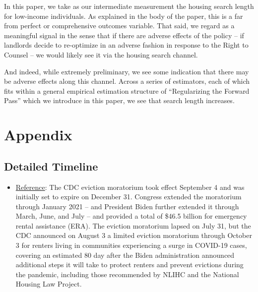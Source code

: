 \documentclass[a4paper,12pt]{article}
\begin{document}
In this paper, we take as our intermediate measurement the housing search length for low-income individuals. As explained in the body of the paper, this is a far from perfect or comprehensive outcomes variable. That said, we regard as a meaningful signal in the sense that if there are adverse effects of the policy -- if landlords decide to re-optimize in an adverse fashion in response to the Right to Counsel -- we would likely see it via the housing search channel. \par 
And indeed, while extremely preliminary, we see some indication that there may be adverse effects along this channel. Across a series of estimators, each of which fits within a general empirical estimation structure of ``Regularizing the Forward Pass'' which we introduce in this paper, we see that search length increases.

%


\section{Appendix}

\subsection{Detailed Timeline}
\begin{itemize}
    \item \href{https://nlihc.org/sites/default/files/Overview-of-National-Eviction-Moratorium.pdf}{Reference}: The CDC eviction moratorium took effect September 4 and was initially set to expire on December 31.
Congress extended the moratorium through January 2021 – and President Biden further extended it
through March, June, and July – and provided a total of \$46.5 billion for emergency rental assistance
(ERA). The eviction moratorium lapsed on July 31, but the CDC announced on August 3 a limited eviction
moratorium through October 3 for renters living in communities experiencing a surge in COVID-19 cases,
covering an estimated 80%
day after the Biden administration announced additional steps it will take to protect renters and prevent
evictions during the pandemic, including those recommended by NLIHC and the National Housing Law
Project.
\end{itemize}
\end{document}
